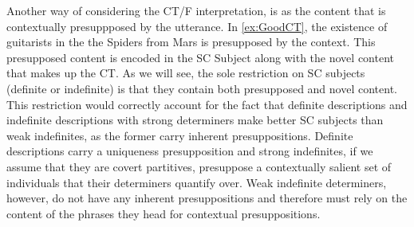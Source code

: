 \documentclass[letterpaper]{article}
\begin{document}
Another way of considering the CT/F interpretation, is  as the content that is contextually presuppposed by the utterance.
In \ref{ex:GoodCT}, the existence of guitarists in the the Spiders from Mars is presupposed by the context.
This presupposed content is encoded in the SC Subject along with the novel content that makes up the CT.
As we will see, the sole restriction on SC subjects (definite or indefinite) is that they contain both presupposed and novel content.
This restriction would correctly account for the fact that definite descriptions and indefinite descriptions with strong determiners make better SC subjects than weak indefinites, as the former carry inherent presuppositions.
Definite descriptions carry a uniqueness presupposition and strong indefinites, if we assume that they are covert partitives, presuppose a contextually salient set of individuals that their determiners quantify over.
Weak indefinite determiners, however, do not have any inherent presuppositions and therefore must rely on the content of the phrases they head for contextual presuppositions.


\printbibliography
\end{document}
